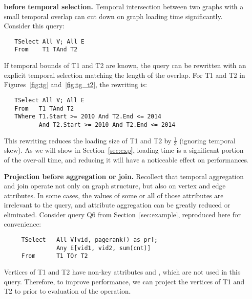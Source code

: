 {\bf {} before temporal selection.}  Temporal intersection
between two graphs with a small temporal overlap can cut down on graph
loading time significantly.  Consider this query:

\begin{small}
\begin{verbatim}
   TSelect All V; All E
   From    T1 TAnd T2
\end{verbatim}
\end{small}

If temporal bounds of T1 and T2 are known, the query can be rewritten
with an explicit temporal selection matching the length of the
overlap.  For T1 and T2 in Figures~\ref{fig:tg} and~\ref{fig:tg_t2},
the rewriting is:

\begin{small}
\begin{verbatim}
   TSelect All V; All E
   From   T1 TAnd T2
   TWhere T1.Start >= 2010 And T2.End <= 2014 
          And T2.Start >= 2010 And T2.End <= 2014
\end{verbatim}
\end{small}

This rewriting reduces the loading size of T1 and T2 by $\frac{1}{3}$
(ignoring temporal skew).  As we will show in Section~\ref{sec:exp},
loading time is a significant portion of the over-all time, and
reducing it will have a noticeable effect on performances.

{\bf Projection before aggregation or join.}  Recollect that temporal
aggregation and join operate not only on graph structure, but also on
vertex and edge attributes.  In some cases, the values of some or all
of those attributes are irrelevant to the query, and attribute
aggregation can be greatly reduced or eliminated.  Consider query Q6
from Section~\ref{sec:example}, reproduced here for convenience:

\begin{small}
\begin{verbatim}
     TSelect   All V[vid, pagerank() as pr]; 
               Any E[vid1, vid2, sum(cnt)]
     From      T1 TOr T2
\end{verbatim}
\end{small}

Vertices of T1 and T2 have non-key attributes  and
, which are not used in this query. Therefore, to
improve performance, we can project the vertices of T1 and T2 to
 prior to evaluation of the  operation.

